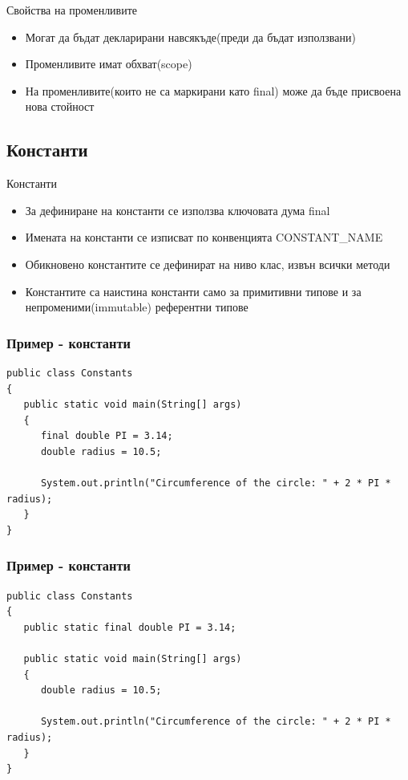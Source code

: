\documentclass{beamer}
\begin{document}
\begin{frame}{Свойства на променливите}
  \transdissolve
  \begin{itemize}
  \item Могат да бъдат декларирани навсякъде(преди да бъдат
    използвани)
  \item Променливите имат обхват(scope)
  \item На променливите(които не са маркирани като final) може да бъде
    присвоена нова стойност
  \end{itemize}
\end{frame}

\subsection{Константи}
\begin{frame}{Константи}
  \begin{itemize}
  \item За дефиниране на константи се използва ключовата дума final
  \item Имената на константи се изписват по конвенцията CONSTANT\_NAME
  \item Обикновено константите се дефинират на ниво клас, извън всички
    методи
  \item Константите са наистина константи само за примитивни типове и
    за непроменими(immutable) референтни типове
  \end{itemize}
\end{frame}

\begin{frame}[fragile]
  \frametitle{Пример - константи}
  \transdissolve
\begin{lstlisting}
public class Constants
{
   public static void main(String[] args)
   {
      final double PI = 3.14;
      double radius = 10.5;

      System.out.println("Circumference of the circle: " + 2 * PI * radius);
   }
}
\end{lstlisting}
\end{frame}

\begin{frame}[fragile]
  \frametitle{Пример - константи}
  \transdissolve
\begin{lstlisting}
public class Constants
{
   public static final double PI = 3.14;

   public static void main(String[] args)
   {
      double radius = 10.5;

      System.out.println("Circumference of the circle: " + 2 * PI * radius);
   }
}
\end{lstlisting}
\end{frame}
\end{document}
